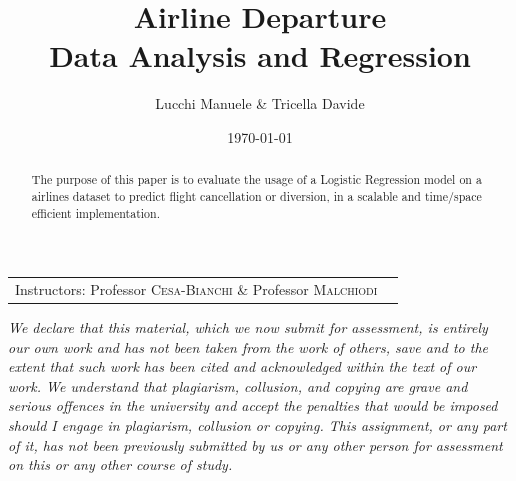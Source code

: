 \documentclass[
	letterpaper, %
	10pt, %
]{class}
\title{Airline Departure\\Data Analysis and Regression} %
\author{Lucchi Manuele \& Tricella Davide} %
\date{\today} %
\begin{document}
\maketitle %

\begin{center}
    \begin{tabular}{l r}
        Instructors: Professor \textsc{Cesa-Bianchi} \& Professor \textsc{Malchiodi}
    \end{tabular}
\end{center}


\textit{We declare that this material,
    which we now submit for assessment, is entirely our own work and has not been
    taken from the work of others, save and to the extent that such work has been cited and
    acknowledged within the text of our work. We understand that plagiarism, collusion,
    and copying are grave and serious offences in the university and accept the penalties that
    would be imposed should I engage in plagiarism, collusion or copying. This assignment,
    or any part of it, has not been previously submitted by us or any other person for
    assessment on this or any other course of study.}


\begin{abstract}
    The purpose of this paper is to evaluate the usage of a Logistic Regression model on a airlines dataset to predict flight cancellation or diversion, in a scalable and time/space efficient implementation.
\end{abstract}


\tableofcontents

\end{document}
